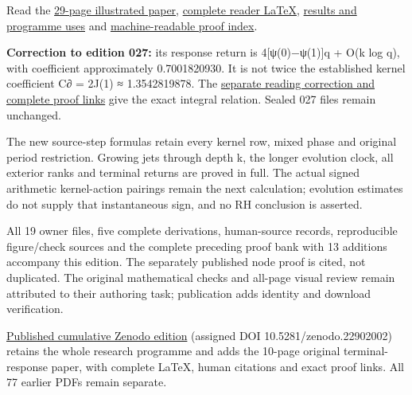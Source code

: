 \documentclass[
]{article}
\begin{document}
Read the
\href{https://github.com/KokunoYumeto/zeta-function-research-reader/blob/main/workbenches/splitzero-tandem/continuations/20260922-support-transport/SUPPORT_TRANSPORT_READER.pdf}{29-page
illustrated paper},
\href{https://github.com/KokunoYumeto/zeta-function-research-reader/blob/main/workbenches/splitzero-tandem/continuations/20260922-support-transport/SUPPORT_TRANSPORT_READER.tex}{complete
reader LaTeX},
\href{https://github.com/KokunoYumeto/zeta-function-research-reader/blob/main/workbenches/splitzero-tandem/continuations/20260922-support-transport/RESULTS_20260922_028.md}{results
and programme uses} and
\href{https://github.com/KokunoYumeto/zeta-function-research-reader/blob/main/workbenches/splitzero-tandem/continuations/20260922-support-transport/RESULT_INDEX.json}{machine-readable
proof index}.

\textbf{Correction to edition 027:} its response return is
4{[}ψ(0)−ψ(1){]}q + O(k log q), with coefficient approximately
0.7001820930. It is not twice the established kernel coefficient C∂ =
2J(1) ≈ 1.3542819878. The
\href{https://github.com/KokunoYumeto/zeta-function-research-reader/blob/main/workbenches/splitzero-tandem/continuations/20260922-support-transport/CORRECTION_027_RD15.md}{separate
reading correction and complete proof links} give the exact integral
relation. Sealed 027 files remain unchanged.

The new source-step formulas retain every kernel row, mixed phase and
original period restriction. Growing jets through depth k, the longer
evolution clock, all exterior ranks and terminal returns are proved in
full. The actual signed arithmetic kernel-action pairings remain the
next calculation; evolution estimates do not supply that instantaneous
sign, and no RH conclusion is asserted.

All 19 owner files, five complete derivations, human-source records,
reproducible figure/check sources and the complete preceding proof bank
with 13 additions accompany this edition. The separately published node
proof is cited, not duplicated. The original mathematical checks and
all-page visual review remain attributed to their authoring task;
publication adds identity and download verification.

\href{https://zenodo.org/records/22902002}{Published cumulative Zenodo
edition} (assigned DOI 10.5281/zenodo.22902002) retains the whole
research programme and adds the 10-page original terminal-response
paper, with complete LaTeX, human citations and exact proof links. All
77 earlier PDFs remain separate.
\end{document}
